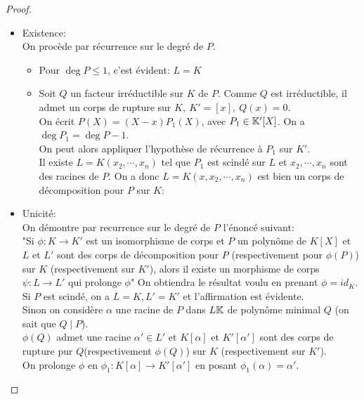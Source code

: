 \begin{proof}
	\begin{itemize}
		\item Existence:\\
		      On procède par récurrence sur le degré de $P$.
		      \begin{itemize}
			      \item Pour $\deg P \leq 1$, c'est évident: $L = K$
			      \item Soit $Q$ un facteur irréductible sur $K$ de $P$.
			            Comme $Q$ est irréductible, il admet un corps de rupture sur $K, \ K' = [x], \ Q(x) = 0$.\\
			            On écrit $P(X) = (X-x)P_1(X)$, avec $P_1 \in \mathbb{K}'[X]$. On a $\deg P_1 = \deg P -1$.\\
			            On peut alors appliquer l'hypothèse de récurrence à $P_1$ sur $K'$.\\
			            Il existe $L = K(x_2, \cdots,  x_n)$ tel que $P_1$ est scindé sur $L$ et
			            $x_2, \cdots, x_n$ sont des racines de $P$. On a donc $L = K(x, x_2, \cdots, x_n)$ est bien un
			            corps de décomposition pour $P$ sur $K$:
		      \end{itemize}
		\item Unicité:\\
		      On démontre par recurrence sur le degré de $P$ l'énoncé suivant:\\
		      "Si $\phi : K \to K'$ est un isomorphisme de corps et $P$ un polynôme de $K[X]$ et $L$ et $L'$
		      sont des corps de décomposition pour $P$ (respectivement pour $\phi(P)$) sur $K$ (respectivement sur $K'$),
		      alors il existe un morphisme de corps $\psi: L \to L'$ qui prolonge $\phi$"
		      On obtiendra le résultat voulu en prenant $\phi = id_K$.\\

		      Si $P$ est scindé, on a $L=K, L'=K'$ et l'affirmation est évidente.\\

		      Sinon on considère $\alpha$ une racine de $P$ dans $L\mathbb{K}$ de polynôme minimal $Q$ (on sait que $Q \mid P$).\\
		      $\phi (Q)$ admet une racine $\alpha' \in L'$ et $K[\alpha]$ et $K'[\alpha']$ sont des corps de rupture pur $Q$(respectivement $\phi(Q)$)
		      sur $K$ (respectivement sur $K'$).\\

		      On prolonge $\phi$ en $\phi_1 : K[\alpha] \to K'[\alpha']$ en posant $\phi_1(\alpha) = \alpha'$.\\


\end{itemize}
\end{proof}
